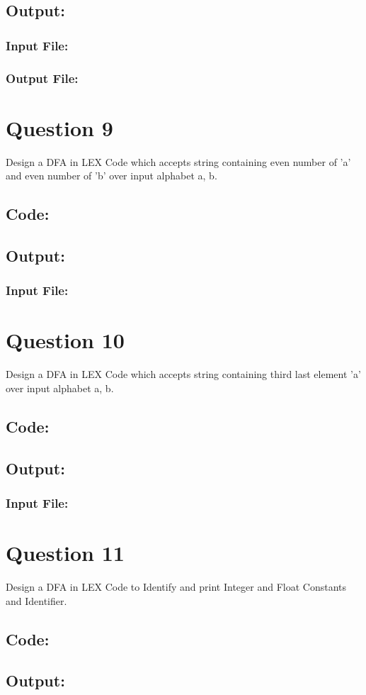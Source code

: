 \documentclass{article}
\begin{document}
\subsection*{Output:}
\subsubsection*{Input File:}

\subsubsection*{Output File:}


\newpage
\section*{Question 9}
Design a DFA in LEX Code which accepts string containing even 
number of 'a' and even number of 'b' over input alphabet {a, b}.
\subsection*{Code:}

\newpage
\subsection*{Output:}
\subsubsection*{Input File:}

\newpage
\section*{Question 10}
Design a DFA in LEX Code which accepts string containing third 
last element 'a' over input alphabet {a, b}.
\subsection*{Code:}

\newpage
\subsection*{Output:}
\subsubsection*{Input File:}

\newpage
\section*{Question 11}
Design a DFA in LEX Code to Identify and print Integer and Float Constants and Identifier.
\subsection*{Code:}

\newpage
\subsection*{Output:}

\end{document}

